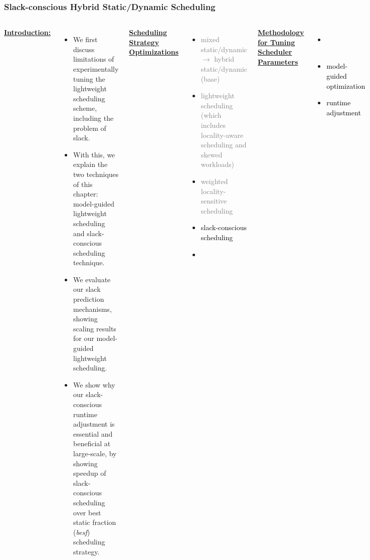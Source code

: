 \begin{frame}
\frametitle{Slack-conscious Hybrid Static/Dynamic Scheduling}
\begin{columns}[T]
         {\small  \underline{\textbf{Introduction:}}} \\
         \begin{itemize}
           \tiny \item \tiny We first discuss limitations of
           experimentally tuning the lightweight scheduling scheme,
           including the problem of slack. 
         \item \tiny With this, we explain the two techniques of this
           chapter: model-guided lightweight scheduling and
           slack-conscious scheduling technique. 
         \item \tiny We evaluate our slack prediction mechanisms,
           showing scaling results for our model-guided lightweight
           scheduling. 
         \item \tiny We show why our slack-conscious runtime
           adjustment is essential and beneficial at large-scale, by
           showing speedup of slack-conscious scheduling over best
           static fraction (\textit{besf}) scheduling strategy. 
         \end{itemize}
\vrule{} 
                {\tiny  \underline{\textbf{Scheduling Strategy Optimizations}}} \\
                \begin{itemize}
                  \tiny \item \tiny \textcolor{gray} {mixed static/dynamic $\rightarrow$ hybrid static/dynamic  (base)}
                \item \tiny  \textcolor{gray} {lightweight scheduling (which includes locality-aware scheduling and skewed workloads)}
                \item \tiny \textcolor{gray} {weighted locality-sensitive scheduling}
                \item \tiny \textcolor{black} {slack-conscious scheduling}
                \item \tiny \textcolor{white} {staggered hybrid static/dynamic scheduling}
                \end{itemize}
                    {\tiny \underline{\textbf { Methodology for Tuning Scheduler Parameters}}}
                    \begin{itemize}
                      \tiny \item \tiny \textcolor{white} {experimental tuning}
                    \item \tiny \textcolor{black} {model-guided optimization} %
                    \item \tiny \textcolor{black} {runtime adjustment}  %
                \end{itemize}
\end{columns}
\end{frame}

